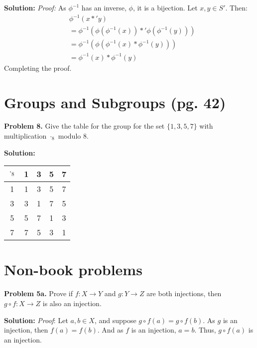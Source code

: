 \documentclass[12pt, letterpaper]{article}
\newenvironment{problem}
    [1]
    {\noindent \textbf{Problem #1.}}
    {\vspace{3mm}}
\newenvironment{solution}
    [0]
    {\noindent \textbf{Solution:}} 
    {\vspace{3mm}}
\begin{document}
    \begin{solution}
        \emph{Proof:} As $\phi^{-1}$ has an inverse, $\phi$, it is a bijection.
        Let $x, y \in S'$. Then:
        \begin{align*}
            &\phi^{-1}(x *' y)\\
            &=\phi^{-1}(\phi(\phi^{-1}(x)) *' \phi(\phi^{-1}(y)))\\
            &=\phi^{-1}(\phi(\phi^{-1}(x) * \phi^{-1}(y)))\\
            &=\phi^{-1}(x) * \phi^{-1}(y)
        \end{align*}
        Completing the proof.
    \end{solution}
\section{Groups and Subgroups (pg. 42)}
    \begin{problem}{8}
        Give the table for the group for the set $\{1, 3, 5, 7\}$ with multiplication
        $\cdot_8$ modulo 8.
    \end{problem}

    \begin{solution}
        \begin{center}
        \begin{tabular}{ c | c c c c } 
            $\cdot_8$ & 1 & 3 & 5 & 7 \\ 
            \hline
            1 & 1 & 3 & 5 & 7 \\ 
            3 & 3 & 1 & 7 & 5 \\ 
            5 & 5 & 7 & 1 & 3 \\ 
            7 & 7 & 5 & 3 & 1 \\
        \end{tabular}
        \end{center}
    \end{solution}
\section{Non-book problems}
    \begin{problem}{5a}
        Prove if $f:X \rightarrow Y$ and $g: Y \rightarrow Z$ are both injections,
        then $g \circ f: X \rightarrow Z$ is also an injection.
    \end{problem}

    \begin{solution}
        \emph{Proof}: Let $a, b \in X$, and suppose $g \circ f(a) = g \circ f(b)$. As $g$
        is an injection, then $f(a) = f(b)$. And as $f$ is an injection, $a = b$. Thus,
        $g \circ f(a)$ is an injection.
    \end{solution}
\end{document}
